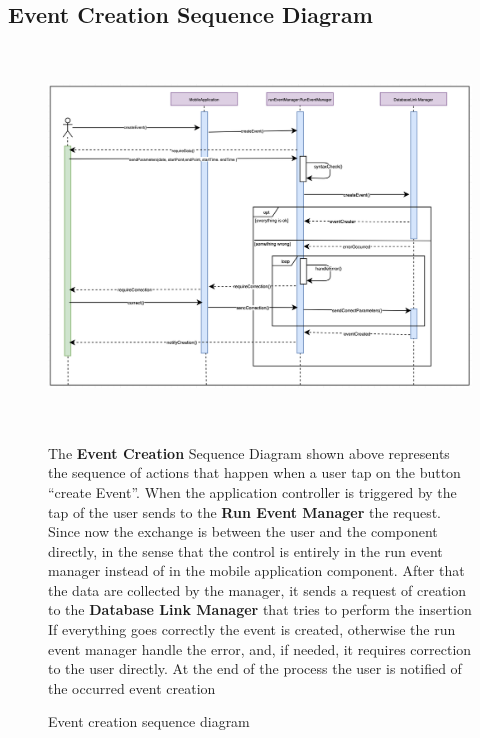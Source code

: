 \documentclass[DD.tex]{subfiles}
\begin{document}
\subsection{Event Creation Sequence Diagram}
\begin{figure}[h!]
\centering
\includegraphics[height=10.00cm,keepaspectratio]{Figures/EventCreation}
\caption{Event creation sequence diagram}

The \textbf{Event Creation} Sequence Diagram shown above represents the sequence of actions that happen when a user tap on the button “create Event”.
When the application controller is triggered by the tap of the user sends to the \textbf{Run Event Manager} the request.
Since now the exchange is between the user and the component directly, in the sense that the control is entirely in the run event manager instead of in the mobile application component.
After that the data are collected by the manager, it sends a request of creation to the \textbf{Database Link Manager }that tries to perform the insertion
If everything goes correctly the event is created, otherwise the run event manager handle the error, and, if needed, it requires correction to the user directly.
At the end of the process the user is notified of the occurred event creation
\end{figure}

\newpage
\end{document}
